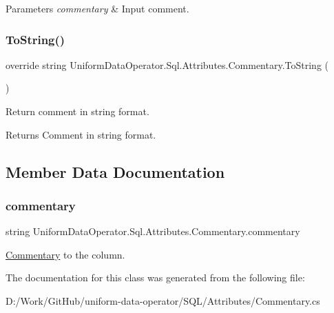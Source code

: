\begin{DoxyParams}{Parameters}
{\em commentary} & Input comment.\\
\hline
\end{DoxyParams}
\mbox{\label{class_uniform_data_operator_1_1_sql_1_1_attributes_1_1_commentary_a254d1f32018f1686b615a9ced5c0b1d5}} 
\subsubsection{\texorpdfstring{To\+String()}{ToString()}}
{\footnotesize\ttfamily override string Uniform\+Data\+Operator.\+Sql.\+Attributes.\+Commentary.\+To\+String (\begin{DoxyParamCaption}{ }\end{DoxyParamCaption})}



Return comment in string format. 

\begin{DoxyReturn}{Returns}
Comment in string format.
\end{DoxyReturn}


\subsection{Member Data Documentation}
\mbox{\label{class_uniform_data_operator_1_1_sql_1_1_attributes_1_1_commentary_a5cb463ba92cc10199d1a8ffb8c8729fd}} 
\subsubsection{\texorpdfstring{commentary}{commentary}}
{\footnotesize\ttfamily string Uniform\+Data\+Operator.\+Sql.\+Attributes.\+Commentary.\+commentary\hspace{0.3cm}{\ttfamily [protected]}}



\mbox{\hyperlink{class_uniform_data_operator_1_1_sql_1_1_attributes_1_1_commentary}{Commentary}} to the column. 



The documentation for this class was generated from the following file\+:\begin{DoxyCompactItemize}
\item 
D\+:/\+Work/\+Git\+Hub/uniform-\/data-\/operator/\+S\+Q\+L/\+Attributes/Commentary.\+cs\end{DoxyCompactItemize}

